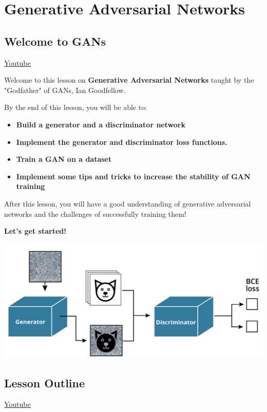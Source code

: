 \chapter{Generative Adversarial Networks}

\section{Welcome to GANs}
\href{https://www.youtube.com/watch?v=-h2D0ZWmCM8}{Youtube} \newline

Welcome to this lesson on \textbf{Generative Adversarial Networks} taught by the "Godfather" of GANs, Ian Goodfellow. \newline

By the end of this lesson, you will be able to:

\begin{itemize}
    \item \textbf{Build a generator and a discriminator network}
    \item \textbf{Implement the generator and discriminator loss functions.}
    \item \textbf{Train a GAN on a dataset}
    \item \textbf{Implement some tips and tricks to increase the stability of GAN training}
\end{itemize}
After this lesson, you will have a good understanding of generative adversarial networks and the challenges of successfully training them!

\textbf{Let's get started!}

\includegraphics[width=1\linewidth]{img//genAdvNet/screen-shot-2022-05-10-at-9.24.21-am.jpeg}


\section{Lesson Outline}
\href{https://www.youtube.com/watch?v=vu3JV-Va-PM}{Youtube} \newline

